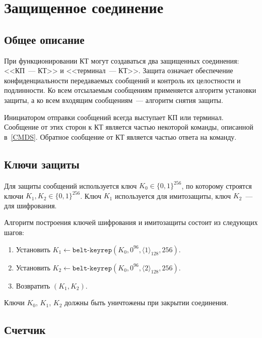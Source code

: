 \section{Защищенное соединение}\label{CRYPTO.SM}

\subsection{Общее описание}

При функционировании КТ могут создаваться два защищенных соединения: <<КП~--- 
КТ>> и <<терминал~--- КТ>>. Защита означает обеспечение конфиденциальности 
передаваемых сообщений и контроль их целостности и подлинности. Ко всем 
отсылаемым сообщениям применяется алгоритм установки защиты, а ко всем входящим 
сообщениям~---  алгоритм снятия защиты.

Инициатором отправки сообщений всегда выступает КП или терминал.
Сообщение от этих сторон к КТ является частью некоторой команды, 
описанной в~\ref{CMDS}. Обратное сообщение от КТ является частью ответа на 
команду.

\subsection{Ключи защиты}

Для защиты сообщений используется ключ $K_0\in\{0,1\}^{256}$, по которому строятся 
ключи $K_1, K_2 \in\{0,1\}^{256}$. Ключ $K_1$ используется для имитозащиты, 
ключ $K_2$~--- для шифрования.

Алгоритм построения ключей шифрования и имитозащиты состоит из следующих шагов:

\begin{enumerate}
\item
Установить 
$K_1\gets\texttt{belt-keyrep}(K_0, 0^{96}, \langle 1 \rangle_{128}, 256)$.

\item
Установить 
$K_2\gets\texttt{belt-keyrep}(K_0, 0^{96}, \langle 2 \rangle_{128}, 256)$.

\item
Возвратить $(K_1, K_2)$.
\end{enumerate}

Ключи $K_0$, $K_1$, $K_2$ должны быть уничтожены при закрытии соединения.

\subsection{Счетчик}\label{CRYPTO.SM.Ctr}

